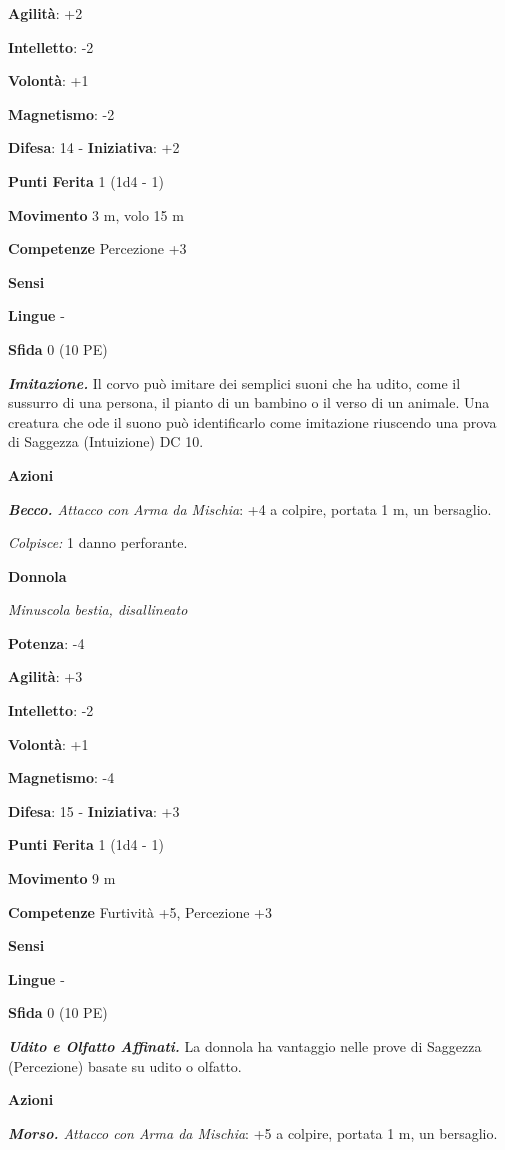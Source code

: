 \begin{multicols}{2}
\textbf{Agilità}: +2

\textbf{Intelletto}: -2

\textbf{Volontà}: +1

\textbf{Magnetismo}: -2

\textbf{Difesa}: 14 - \textbf{Iniziativa}: +2

\textbf{Punti Ferita} 1 (1d4 - 1)

\textbf{Movimento} 3 m, volo 15 m

\textbf{Competenze} Percezione +3

\textbf{Sensi} 

\textbf{Lingue} -

\textbf{Sfida} 0 (10 PE)\smallskip

\emph{\textbf{Imitazione.}} Il corvo può imitare dei semplici suoni che
ha udito, come il sussurro di una persona, il pianto di un bambino o il
verso di un animale. Una creatura che ode il suono può identificarlo
come imitazione riuscendo una prova di Saggezza (Intuizione) DC 10.

\smallskip\textbf{Azioni}

\emph{\textbf{Becco.} Attacco con Arma da Mischia}: +4 a colpire,
portata 1 m, un bersaglio.

\emph{Colpisce:} 1 danno perforante.

\textbf{Donnola}

\emph{Minuscola bestia, disallineato}

\textbf{Potenza}: -4

\textbf{Agilità}: +3

\textbf{Intelletto}: -2

\textbf{Volontà}: +1

\textbf{Magnetismo}: -4

\textbf{Difesa}: 15 - \textbf{Iniziativa}: +3

\textbf{Punti Ferita} 1 (1d4 - 1)

\textbf{Movimento} 9 m

\textbf{Competenze} Furtività +5, Percezione +3

\textbf{Sensi} 

\textbf{Lingue} -

\textbf{Sfida} 0 (10 PE)\smallskip

\emph{\textbf{Udito e Olfatto Affinati.}} La donnola ha vantaggio nelle
prove di Saggezza (Percezione) basate su udito o olfatto.

\smallskip\textbf{Azioni}

\emph{\textbf{Morso.} Attacco con Arma da Mischia}: +5 a colpire,
portata 1 m, un bersaglio.


\end{multicols}
